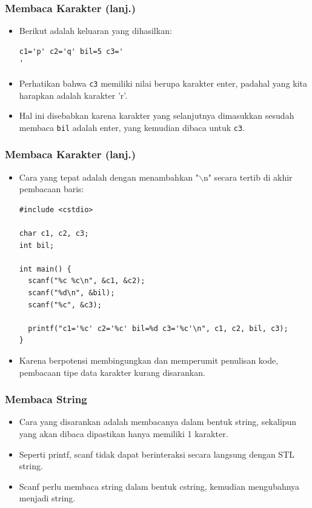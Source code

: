\begin{frame}[fragile]
\frametitle{Membaca Karakter (lanj.)}
  \begin{itemize}
    \item Berikut adalah keluaran yang dihasilkan:
\begin{lstlisting}
c1='p' c2='q' bil=5 c3='
'
\end{lstlisting}    
    \item Perhatikan bahwa \texttt{c3} memiliki nilai berupa karakter enter, padahal yang kita harapkan adalah karakter 'r'.
    \item Hal ini disebabkan karena karakter yang selanjutnya dimasukkan sesudah membaca \texttt{bil} adalah enter, yang kemudian dibaca untuk \texttt{c3}.
  \end{itemize}
\end{frame}

\begin{frame}[fragile]
\frametitle{Membaca Karakter (lanj.)}
  \begin{itemize}
    \item Cara yang tepat adalah dengan menambahkan "$\backslash$n" secara tertib di akhir pembacaan baris:
\begin{lstlisting}
#include <cstdio>

char c1, c2, c3;
int bil;

int main() {
  scanf("%c %c\n", &c1, &c2);
  scanf("%d\n", &bil);
  scanf("%c", &c3);

  printf("c1='%c' c2='%c' bil=%d c3='%c'\n", c1, c2, bil, c3);
}
\end{lstlisting}
    \item Karena berpotensi membingungkan dan memperumit penulisan kode, pembacaan tipe data karakter kurang disarankan.
  \end{itemize}
\end{frame}

\begin{frame}[fragile]
\frametitle{Membaca String}
\begin{itemize}
  \item Cara yang disarankan adalah membacanya dalam bentuk string, sekalipun yang akan dibaca dipastikan hanya memiliki 1 karakter.
  \item Seperti printf, scanf tidak dapat berinteraksi secara langsung dengan STL string.
  \item Scanf perlu membaca string dalam bentuk cstring, kemudian mengubahnya menjadi string.
\end{itemize}
\end{frame}

